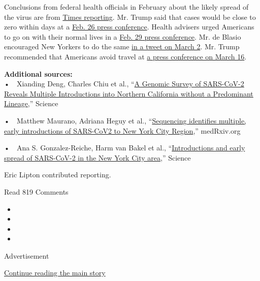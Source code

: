 Conclusions from federal health officials in February about the likely
spread of the virus are from
\href{https://www.nytimes.com/2020/04/11/us/politics/coronavirus-trump-response.html}{Times
reporting}. Mr. Trump said that cases would be close to zero within days
at a
\href{https://www.whitehouse.gov/briefings-statements/remarks-president-trump-vice-president-pence-members-coronavirus-task-force-press-conference/}{Feb.
26 press conference}. Health advisers urged Americans to go on with
their normal lives in a
\href{https://www.whitehouse.gov/briefings-statements/remarks-president-trump-vice-president-pence-members-coronavirus-task-force-press-conference-2/}{Feb.
29 press conference}. Mr. de Blasio encouraged New Yorkers to do the
same
\href{https://twitter.com/BilldeBlasio/status/1234648718714036229}{in a
tweet on March 2}. Mr. Trump recommended that Americans avoid travel at
\href{https://www.whitehouse.gov/briefings-statements/remarks-president-trump-vice-president-pence-members-coronavirus-task-force-press-briefing-3/}{a
press conference on March 16}.

\textbf{Additional sources:}\\
•~~Xianding Deng, Charles Chiu et al.,
``\href{https://science.sciencemag.org/content/sci/early/2020/06/05/science.abb9263.full.pdf}{A
Genomic Survey of SARS-CoV-2 Reveals Multiple Introductions into
Northern California without a Predominant Lineage},'' Science

•~~Matthew Maurano, Adriana Heguy et al.,
``\href{https://www.medrxiv.org/content/medrxiv/early/2020/04/23/2020.04.15.20064931.full.pdf}{Sequencing
identifies multiple, early introductions of SARS-CoV2 to New York City
Region},'' medRxiv.org

•~~Ana S. Gonzalez-Reiche, Harm van Bakel et al.,
``\href{https://science.sciencemag.org/content/early/2020/05/28/science.abc1917}{Introductions
and early spread of SARS-CoV-2 in the New York City area},'' Science

Eric Lipton contributed reporting.

Read 819 Comments

\begin{itemize}
\item
\item
\item
\item
\end{itemize}

Advertisement

\protect\hyperlink{after-bottom}{Continue reading the main story}

